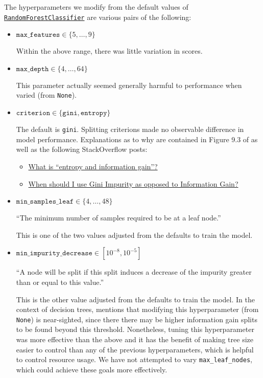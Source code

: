 \documentclass[11pt]{article}
\theoremstyle{definition}
\numberwithin{equation}{section}
\begin{document}
The hyperparameters we modify from the default values of 
\href{https://scikit-learn.org/stable/modules/generated/sklearn.ensemble.RandomForestClassifier.html\#sklearn.ensemble.RandomForestClassifier}{\texttt{RandomForestClassifier}}
are various pairs of the following:
\begin{itemize}
\item $\mathtt{max\_features} \in \{5, \ldots, 9\}$

Within the above range, there was little variation in scores.

\item $\mathtt{max\_depth} \in \{4, \ldots, 64\}$

This parameter actually seemed generally harmful to performance when varied (from \texttt{None}).

\item $\mathtt{criterion} \in \{\mathtt{gini}, \mathtt{entropy}\}$

The default is \texttt{gini}. Splitting criterions made no observable difference in model performance. Explanations as to why are contained in Figure 9.3 of \cite{hastieElementsStatisticalLearning2009} as well as the following StackOverflow posts:
	\begin{itemize}
	\item \href{https://stackoverflow.com/a/1859910}{What is ``entropy and information gain''?}
	\item \href{https://datascience.stackexchange.com/a/10273|}{When should I use Gini Impurity as opposed to Information Gain?}
	\end{itemize}


\item $\mathtt{min\_samples\_leaf} \in \{4, \ldots, 48\}$

``The minimum number of samples required to be at a leaf node.''

This is one of the two values adjusted from the defaults to train the model.

\item $\mathtt{min\_impurity\_decrease} \in [10^{-8}, 10^{-5}]$

``A node will be split if this split induces a decrease of the impurity greater than or equal to this value.''

This is the other value adjusted from the defaults to train the model.
In the context of decision trees, \cite{hastieElementsStatisticalLearning2009} mentions that modifying this hyperparameter
(from \texttt{None}) is near-sighted, since there there may be higher information gain splits to be found beyond this threshold.
Nonetheless, tuning this hyperparameter was more effective than the above and it 
has the benefit of making tree size easier to control than any of the previous hyperparameters, which is
helpful to control resource usage. We have not attempted to vary
\texttt{max\_leaf\_nodes}, which could achieve these goals more effectively.
\end{itemize}
\end{document}
